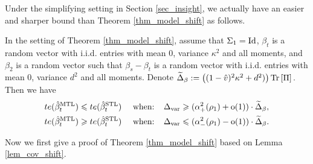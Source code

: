 Under the simplifying setting in Section \ref{sec_insight}, we actually have an easier and sharper bound than Theorem \ref{thm_model_shift} as follows. 
\begin{lemma}\label{prop_model_shift_tight}
		In the setting of Theorem \ref{thm_model_shift}, assume that $\Sigma_1 =\operatorname{Id}$,
		$\beta_t$ is a random vector with i.i.d. entries with mean $0$, variance $\kappa^2$ and all moments, and $\beta_2$ is a random vector such that $\beta_s - \beta_t$ is a random vector with i.i.d. entries with mean $0$, variance $d^2$ and all moments. Denote
		$\widetilde \Delta_{\beta} := \left({(1 - \hat{v})^2 \kappa^2 + d^2)}\right) \operatorname{Tr}\left[\Pi\right].$
	Then we have
		\begin{align*}
			te(\hat{\beta}_t^{\text{MTL}}) \leqslant te(\hat{\beta}_t^{\text{STL}})\quad \text{ when: }\ \  & \Delta_{\text{var}} \geqslant  (\alpha_+^2(\rho_1)+\operatorname{o}(1))\cdot \widetilde \Delta_{\beta}, \\
			te(\hat{\beta}_t^{\text{MTL}}) \geqslant te(\hat{\beta}_t^{\text{STL}})\quad \text{ when: }\ \  & \Delta_{\text{var}} \leqslant (\alpha_-^2(\rho_1)-\operatorname{o}(1))\cdot \widetilde\Delta_{\beta}.
		\end{align*}
\end{lemma}

Now we first give a proof of Theorem \ref{thm_model_shift} based on Lemma \ref{lem_cov_shift}. 

